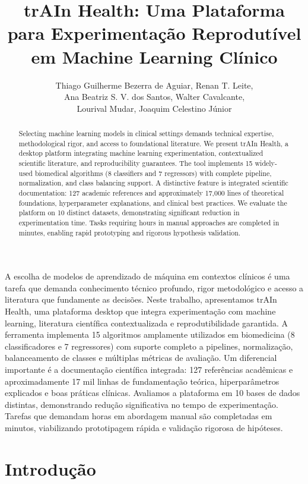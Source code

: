 \documentclass[12pt]{article}
\title{trAIn Health: Uma Plataforma para Experimentação Reprodutível em Machine Learning Clínico}
\author{Thiago Guilherme Bezerra de Aguiar, Renan T. Leite, \\ 
Ana Beatriz S. V. dos Santos, Walter Cavalcante, \\
Lourival Mudar, Joaquim Celestino Júnior}
\begin{document}
\maketitle

\begin{abstract}
Selecting machine learning models in clinical settings demands technical expertise, methodological rigor, and access to foundational literature. We present trAIn Health, a desktop platform integrating machine learning experimentation, contextualized scientific literature, and reproducibility guarantees. The tool implements 15 widely-used biomedical algorithms (8 classifiers and 7 regressors) with complete pipeline, normalization, and class balancing support. A distinctive feature is integrated scientific documentation: 127 academic references and approximately 17,000 lines of theoretical foundations, hyperparameter explanations, and clinical best practices. We evaluate the platform on 10 distinct datasets, demonstrating significant reduction in experimentation time. Tasks requiring hours in manual approaches are completed in minutes, enabling rapid prototyping and rigorous hypothesis validation.
\end{abstract}

\begin{resumo}
A escolha de modelos de aprendizado de máquina em contextos clínicos é uma tarefa que demanda conhecimento técnico profundo, rigor metodológico e acesso a literatura que fundamente as decisões. Neste trabalho, apresentamos trAIn Health, uma plataforma desktop que integra experimentação com machine learning, literatura científica contextualizada e reprodutibilidade garantida. A ferramenta implementa 15 algoritmos amplamente utilizados em biomedicina (8 classificadores e 7 regressores) com suporte completo a pipelines, normalização, balanceamento de classes e múltiplas métricas de avaliação. Um diferencial importante é a documentação científica integrada: 127 referências acadêmicas e aproximadamente 17 mil linhas de fundamentação teórica, hiperparâmetros explicados e boas práticas clínicas. Avaliamos a plataforma em 10 bases de dados distintas, demonstrando redução significativa no tempo de experimentação. Tarefas que demandam horas em abordagem manual são completadas em minutos, viabilizando prototipagem rápida e validação rigorosa de hipóteses.
\end{resumo}

\section{Introdução}
\end{document}
